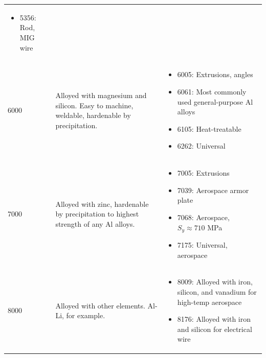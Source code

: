 \documentclass[
10pt,
a4paper,
openany,
svgnames,
]{book}
\begin{document}
\begin{table}[H]
\begin{tabular}{lp{6cm}p{6cm}}
\begin{itemize}
    \item 5356: Rod, MIG wire
    \end{itemize} \\
    6000 & Alloyed with magnesium and silicon. Easy to machine, weldable, hardenable by precipitation. & \begin{itemize}
    \item 6005: Extrusions, angles
    \item 6061: Most commonly used general-purpose Al alloys
    \item 6105: Heat-treatable
    \item 6262: Universal 
    \end{itemize} \\
    7000 & Alloyed with zinc, hardenable by precipitation to highest strength of any Al alloys. & \begin{itemize}
    \item 7005: Extrusions
    \item 7039: Aerospace armor plate
    \item 7068: Aerospace, $S_y \approx 710$ MPa
    \item 7175: Universal, aerospace
    \end{itemize} \\
    8000 & Alloyed with other elements. Al-Li, for example. & \begin{itemize}
    \item 8009: Alloyed with iron, silicon, and vanadium for high-temp aerospace
    \item 8176: Alloyed with iron and silicon for electrical wire
    \end{itemize} \\
    \bottomrule
  \end{tabular}
\end{table}
\end{document}
